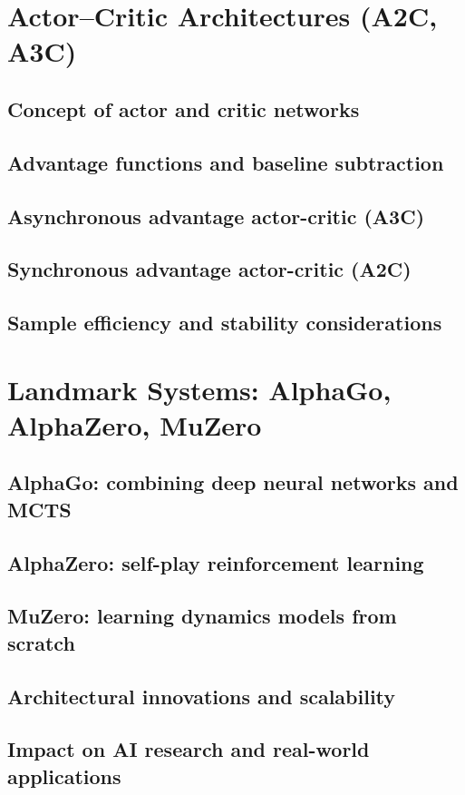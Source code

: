 \section{Actor--Critic Architectures (A2C, A3C)}
\subsection{Concept of actor and critic networks}
\subsection{Advantage functions and baseline subtraction}
\subsection{Asynchronous advantage actor-critic (A3C)}
\subsection{Synchronous advantage actor-critic (A2C)}
\subsection{Sample efficiency and stability considerations}

\section{Landmark Systems: AlphaGo, AlphaZero, MuZero}
\subsection{AlphaGo: combining deep neural networks and MCTS}
\subsection{AlphaZero: self-play reinforcement learning}
\subsection{MuZero: learning dynamics models from scratch}
\subsection{Architectural innovations and scalability}
\subsection{Impact on AI research and real-world applications}
